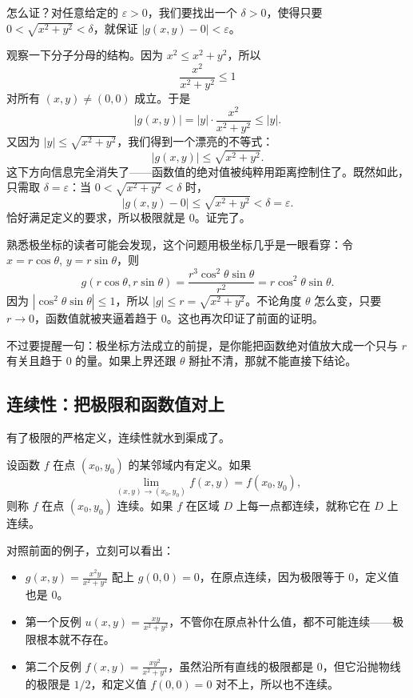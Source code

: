 怎么证？对任意给定的 \(\varepsilon>0\)，我们要找出一个 \(\delta>0\)，使得只要 \(0<\sqrt{x^2+y^2}<\delta\)，就保证 \(|g(x,y)-0|<\varepsilon\)。

观察一下分子分母的结构。因为 \(x^2\le x^2+y^2\)，所以
\[
\frac{x^2}{x^2+y^2}\le 1
\]
对所有 \((x,y)\neq(0,0)\) 成立。于是
\[
|g(x,y)| = |y|\cdot\frac{x^2}{x^2+y^2} \le |y|.
\]
又因为 \(|y|\le\sqrt{x^2+y^2}\)，我们得到一个漂亮的不等式：
\[
|g(x,y)| \le \sqrt{x^2+y^2}.
\]
这下方向信息完全消失了——函数值的绝对值被纯粹用距离控制住了。既然如此，只需取 \(\delta=\varepsilon\)：当 \(0<\sqrt{x^2+y^2}<\delta\) 时，
\[
|g(x,y)-0| \le \sqrt{x^2+y^2} < \delta = \varepsilon.
\]
恰好满足定义的要求，所以极限就是 \(0\)。证完了。

熟悉极坐标的读者可能会发现，这个问题用极坐标几乎是一眼看穿：令 \(x=r\cos\theta\), \(y=r\sin\theta\)，则
\[
g(r\cos\theta,r\sin\theta)=\frac{r^3\cos^2\theta\sin\theta}{r^2}=r\cos^2\theta\sin\theta.
\]
因为 \(|\cos^2\theta\sin\theta|\le 1\)，所以 \(|g|\le r=\sqrt{x^2+y^2}\)。不论角度 \(\theta\) 怎么变，只要 \(r\to0\)，函数值就被夹逼着趋于 \(0\)。这也再次印证了前面的证明。

不过要提醒一句：极坐标方法成立的前提，是你能把函数绝对值放大成一个只与 \(r\) 有关且趋于 \(0\) 的量。如果上界还跟 \(\theta\) 掰扯不清，那就不能直接下结论。

\subsection{连续性：把极限和函数值对上}

有了极限的严格定义，连续性就水到渠成了。

\begin{definition}[二元函数的连续性]
设函数 \(f\) 在点 \((x_0,y_0)\) 的某邻域内有定义。如果
\[
\lim_{(x,y)\to(x_0,y_0)}f(x,y)=f(x_0,y_0),
\]
则称 \(f\) 在点 \((x_0,y_0)\) 连续。如果 \(f\) 在区域 \(D\) 上每一点都连续，就称它在 \(D\) 上连续。
\end{definition}

对照前面的例子，立刻可以看出：
\begin{itemize}
    \item \(g(x,y)=\frac{x^2y}{x^2+y^2}\) 配上 \(g(0,0)=0\)，在原点连续，因为极限等于 \(0\)，定义值也是 \(0\)。
    \item 第一个反例 \(u(x,y)=\frac{xy}{x^2+y^2}\)，不管你在原点补什么值，都不可能连续——极限根本就不存在。
    \item 第二个反例 \(f(x,y)=\frac{xy^2}{x^2+y^4}\)，虽然沿所有直线的极限都是 \(0\)，但它沿抛物线的极限是 \(1/2\)，和定义值 \(f(0,0)=0\) 对不上，所以也不连续。
\end{itemize}

